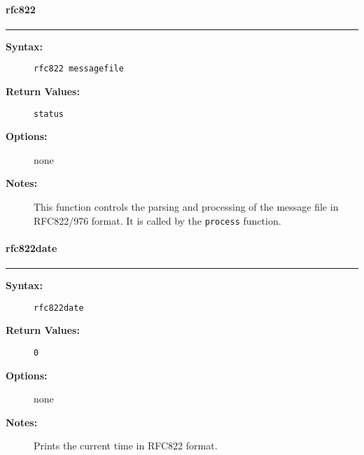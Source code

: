 \vspace {2pt}


\paragraph{rfc822}

\hrule
\begin{description}
\item[{\bf Syntax:}] \mbox{}

{\tt rfc822 messagefile}

\item[{\bf Return Values:}] \mbox{}

{\tt status}

\item[{\bf Options:}] \mbox{}

none

\item[{\bf Notes:}] \mbox{}

This function controls the parsing and 
processing of the message file in RFC822/976 format. It is 
called by the {\tt process} function. 

\end{description}


\vspace {2pt}


\paragraph{rfc822date}

\hrule
\begin{description}
\item[{\bf Syntax:}] \mbox{}

{\tt rfc822date}

\item[{\bf Return Values:}] \mbox{}

\begin{description}
\item[{\tt 0}] \mbox{}



\end{description}


\item[{\bf Options:}] \mbox{}

none

\item[{\bf Notes:}] \mbox{}

Prints the current time in RFC822 format. 

\end{description}


